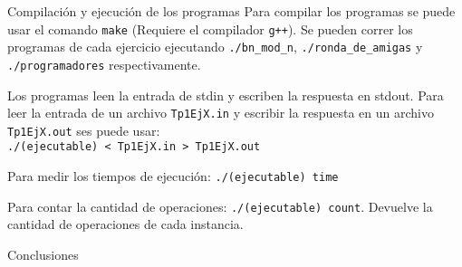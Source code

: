 \documentclass[12pt,titlepage]{article}
\begin{document}
	\newpage

	
	
	\newpage
	
	\begin{section}{Compilación y ejecución de los programas}
	Para compilar los programas se puede usar el comando \texttt{make} (Requiere el compilador \texttt{g++}).
	Se pueden correr los programas de cada ejercicio ejecutando \texttt{./bn\_mod\_n}, \texttt{./ronda\_de\_amigas} y \texttt{./programadores} respectivamente.
		
	Los programas leen la entrada de stdin y escriben la respuesta en stdout. 		Para leer la entrada de un archivo \texttt{Tp1EjX.in} y escribir la respuesta en un archivo \texttt{Tp1EjX.out} ses puede usar:\\ \texttt{./(ejecutable) < Tp1EjX.in > Tp1EjX.out}
		
	Para medir los tiempos de ejecución: \texttt{./(ejecutable) time}

	Para contar la cantidad de operaciones: \texttt{./(ejecutable) count}. Devuelve la cantidad de operaciones de cada instancia.
	\end{section}
	
	\begin{section}{Conclusiones}

	\end{section}
\end{document}

